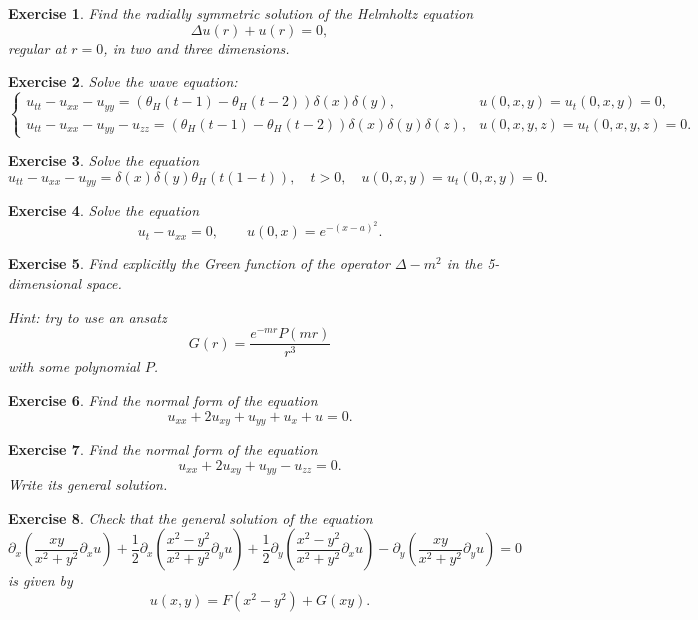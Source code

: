 \documentclass[11pt,a4paper]{article}
\newtheorem*{exercise}{Exercise}
\begin{document}
\begin{exercise}
	Find the radially symmetric solution of the Helmholtz equation
	\[
	\Delta u(r) + u(r) = 0,
	\]
	regular at $r = 0$, in two and three dimensions.
\end{exercise}
\begin{exercise}
	Solve the wave equation:
	\[
	\begin{cases}
		u_{tt} - u_{xx} - u_{yy} = (\theta_H(t - 1) - \theta_H(t - 2)) \delta(x)\delta(y), & u(0, x, y) = u_t(0, x, y) = 0, \\
		u_{tt} - u_{xx} - u_{yy} - u_{zz} = (\theta_H(t - 1) - \theta_H(t - 2)) \delta(x)\delta(y)\delta(z), & u(0, x, y, z) = u_t(0, x, y, z) = 0.
	\end{cases}
	\]
\end{exercise}
\begin{exercise}
	Solve the equation
	\[
	u_{tt} - u_{xx} - u_{yy} = \delta(x)\delta(y)\theta_H(t(1 - t)), \quad t > 0, \quad u(0, x, y) = u_t(0, x, y) = 0.
	\]
\end{exercise}
\begin{exercise}
	Solve the equation
	\[
	u_t - u_{xx} = 0, \qquad u(0, x) = e^{-(x - a)^2}.
	\]
\end{exercise}
\begin{exercise}
	Find explicitly the Green function of the operator $\Delta - m^2$ in the 5-dimensional space.
	
	Hint: try to use an ansatz
	\[
	G(r) = \frac{e^{-mr}P(mr)}{r^3}
	\]
	with some polynomial $P$.
\end{exercise}
\begin{exercise}
	Find the normal form of the equation
	\[
	u_{xx}+2 u_{xy}+u_{yy}+u_x+u=0.
	\]
\end{exercise}

\begin{exercise}
	Find the normal form of the equation
	\[
	u_{xx}+2u_{xy}+u_{yy}-u_{zz}=0.
	\]
	Write its general solution.
\end{exercise}

\begin{exercise}
	Check that the general solution of the equation
	\[
	\partial_x \left(\frac{x y}{x^2+y^2}\partial_x u\right)
	+\frac12 \partial_x \left(\frac{x^2-y^2}{x^2+y^2}\partial_y u\right)
	+\frac12 \partial_y \left(\frac{x^2-y^2}{x^2+y^2}\partial_x u\right)
	- \partial_y\left(\frac{x y}{x^2+y^2}\partial_y u\right)=0
	\]
	is given by
	\[
	u(x,y)=F(x^2-y^2)+G(x y).
	\]
\end{exercise}
\end{document}
